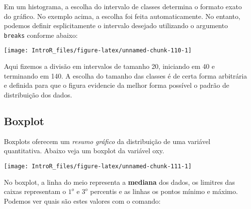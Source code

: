 \documentclass[
]{book}
\newenvironment{Shaded}{\begin{snugshade}}{\end{snugshade}}
\newcommand{\DataTypeTok}[1]{\textcolor[rgb]{0.13,0.29,0.53}{#1}}
\newcommand{\DecValTok}[1]{\textcolor[rgb]{0.00,0.00,0.81}{#1}}
\newcommand{\KeywordTok}[1]{\textcolor[rgb]{0.13,0.29,0.53}{\textbf{#1}}}
\newcommand{\NormalTok}[1]{#1}
\newcommand{\OperatorTok}[1]{\textcolor[rgb]{0.81,0.36,0.00}{\textbf{#1}}}
\newcommand{\StringTok}[1]{\textcolor[rgb]{0.31,0.60,0.02}{#1}}
\begin{document}
Em um histograma, a escolha do intervalo de classes determina o formato exato do gráfico. No exemplo acima, a escolha foi feita automaticamente. No entanto, podemos definir esplicitamente o intervalo desejado utilizando o argumento \texttt{breaks} conforme abaixo:

\begin{Shaded}
\end{Shaded}

\begin{center}\texttt{[image: IntroR\_files/figure-latex/unnamed-chunk-110-1]} \end{center}

Aqui fizemos a divisão em intervalos de tamanho 20, iniciando em 40 e terminando em 140. A escolha do tamanho das classes é de certa forma arbitrária e definida para que o figura evidencie da melhor forma possível o padrão de distribuição dos dados.

\hypertarget{boxplot}{%
\subsection{Boxplot}\label{boxplot}}

Boxplots oferecem um \emph{resumo gráfico} da distribuição de uma variável quantitativa. Abaixo veja um boxplot da variável oxy.

\begin{Shaded}
\end{Shaded}

\begin{center}\texttt{[image: IntroR\_files/figure-latex/unnamed-chunk-111-1]} \end{center}

No boxplot, a linha do meio representa a \textbf{mediana} dos dados, os limitres das caixas representam o \(1^o\) e \(3^o\) percentis e as linhas os pontos mínimo e máximo. Podemos ver quais são estes valores com o comando:
\end{document}
